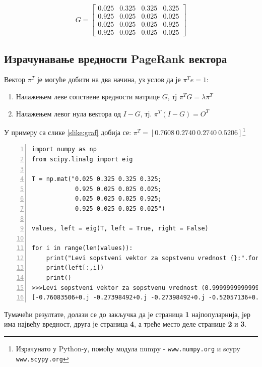 \[G =
\begin{bmatrix}
0.025 & 0.325 & 0.325 & 0.325 \\
0.925 & 0.025 & 0.025 & 0.025 \\
0.025 & 0.025 & 0.025 & 0.925 \\
0.925 & 0.025 & 0.025 & 0.025
\end{bmatrix}
\]

\subsection{Израчунавање вредности PageRank\texttrademark{} вектора}

Вектор $\pi^{T}$ је могуће добити на два начина, уз услов да је $\pi^{T}e = 1$:

\begin{enumerate}
\item Налажењем леве сопствене вредности матрице $G$, тј $\pi^{T}G=\lambda \pi^{T}$
\item Налажењем левог нула вектора од $I - G$, тј. $\pi^{T}(I-G)=O^{T}$
\end{enumerate}

У примеру са слике \ref{slike:graf} добија се: $\pi^{T} = \left [0.7608\: 0.2740\: 0.2740\: 0.5206 \right ]$\footnote{Израчунато у Python-у, помоћу модула numpy - \texttt{www.numpy.org} и scypy \texttt{www.scypy.org}}

\begin{lstlisting}[caption=Израчунавање леве сопствене вредности, label={lst:eigen}, numbers=left]
import numpy as np
from scipy.linalg import eig

T = np.mat("0.025 0.325 0.325 0.325;
            0.925 0.025 0.025 0.025;
            0.025 0.025 0.025 0.925;
            0.925 0.025 0.025 0.025")

values, left = eig(T, left = True, right = False)

for i in range(len(values)):
	print("Levi sopstveni vektor za sopstvenu vrednost {}:".format(values[i]))
	print(left[:,i])
	print()
>>>Levi sopstveni vektor za sopstvenu vrednost (0.9999999999999998+0j):
[-0.76083506+0.j -0.27398492+0.j -0.27398492+0.j -0.52057136+0.j]
\end{lstlisting}

Тумачећи резултате, долази се до закључка да је страница \textbf{1} најпопуларнија, јер има највећу вредност, друга је страница \textbf{4}, а треће место деле странице \textbf{2} и \textbf{3}.

